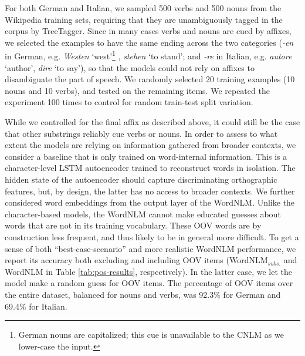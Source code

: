 For both German and Italian, we sampled 500 verbs and 500 nouns from
the Wikipedia training sets, requiring that they are unambiguously
tagged in the corpus by TreeTagger. Since in many cases verbs and
nouns are cued by affixes, we selected the examples to have the same
ending across the two categories (\emph{-en} in German, e.g. \emph{Westen} `west'\footnote{German nouns are capitalized; this cue is unavailable to the CNLM as we lower-case the input.}%
, \emph{stehen} `to stand'; and \emph{-re}
in Italian, e.g. \emph{autore} `author', \emph{dire} `to say'),
so that the models could not rely on affixes to
disambiguate the part of speech. We randomly selected 20 training
examples (10 nouns and 10 verbs), and tested on the remaining items.
We repeated the experiment 100 times to control for random train-test
split variation.

While we controlled for the final affix as described above, it could
still be the case that other substrings reliably cue verbs or
nouns. In order to assess to what extent the models are relying on
information gathered from broader contexts, we consider a baseline
that is only trained on word-internal information. This is a
character-level LSTM autoencoder trained to reconstruct words in
isolation.  The hidden state of the autoencoder should capture
discriminating orthographic features, but, by design, the latter has
no access to broader contexts.  We further considered word embeddings
from the output layer of the WordNLM. Unlike the character-based
models, the WordNLM cannot make educated guesses about words that are
not in its training vocabulary. These OOV words are by construction
less frequent, and thus likely to be in general more difficult. To get
a sense of both ``best-case-scenario'' and more realistic WordNLM
performance, we report its accuracy both excluding and including OOV
items (WordNLM$_{\textit{subs.}}$ and WordNLM in Table
\ref{tab:pos-results}, respectively). In the latter case, we let the
model make a random guess for OOV items.  The percentage of OOV items
over the entire dataset, balanced for nouns and verbs, was 92.3\% for
German and 69.4\% for Italian.


